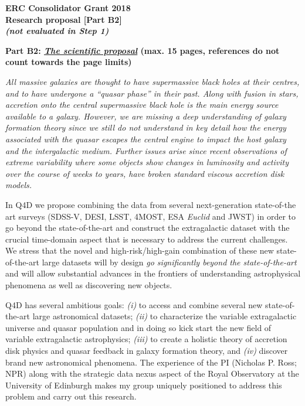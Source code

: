 \documentclass[oneside, a4paper, onecolumn, 11pt]{article}
\begin{document}
\begin{center}
\large \textbf{ERC Consolidator Grant 2018} \\
\large \textbf{Research proposal [Part B2]}  \\
\large \textbf{\emph{(not evaluated in Step 1)}}
\end{center}


\noindent
\textbf{\textcolor{Cerulean}{Part B2: \emph{\underline{The scientific proposal}} (max. 15 pages, references do not count towards the page limits)}}\\

\noindent
{\it 
All massive galaxies are thought to have supermassive black holes at
their centres, and to have undergone a ``quasar phase'' in their
past. Along with fusion in stars, accretion onto the central
supermassive black hole is the main energy source available to a
galaxy. However, we are missing a deep understanding of galaxy
formation theory since we still do not understand in key detail how
the energy associated with the quasar escapes the central engine to
impact the host galaxy and the intergalactic medium. Further issues
arise since recent observations of extreme variability where some
objects show changes in luminosity and activity over the course of
weeks to years, have broken standard viscous accretion disk models.

\smallskip
\smallskip
\noindent
In Q4D we propose combining the data from
several next-generation state-of-the art surveys (SDSS-V, DESI, LSST,
4MOST, ESA {\it Euclid} and JWST) in order to go beyond the
state-of-the-art and construct the extragalactic dataset with the
crucial time-domain aspect that is necessary to address the current
challenges.   
We stress that the novel and
high-risk/high-gain combination of these new state-of-the-art large
datasets will by design {\it go significantly beyond the
state-of-the-art} and will allow substantial advances in the frontiers
of understanding astrophysical phenomena as well as discovering new
objects.

\smallskip
\smallskip
\noindent
Q4D has several ambitious goals: 
{\it (i)} to access and combine several new state-of-the-art large astronomical datasets; 
{\it (ii)}  to characterize the variable extragalactic universe and quasar population and in doing so 
kick start the new field of variable extragalactic astrophysics; 
{\it (iii)}  to create a holistic theory of accretion disk physics and quasar feedback in galaxy 
formation theory, and 
{\it (iv)} discover brand new astronomical phenomena. 
The experience of the PI (Nicholas P. Ross; NPR) along
with the strategic data nexus aspect of the Royal Observatory at the
University of Edinburgh makes my group uniquely positioned to address this problem
and carry out this research.
}
\end{document}
